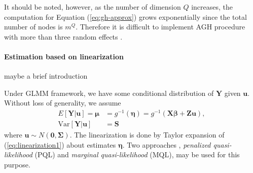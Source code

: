 		It should be noted, however, as the number of dimension $Q$ increases, the computation for Equation (\ref{eq:gh-approx}) grows exponentially since the total number of nodes is $m^Q$.  Therefore it is difficult to implement AGH procedure with more than three random effects \citep{bolker2009generalized}.

		
		\paragraph{Estimation based on linearization}\label{para:linearization}
		
		{\large maybe a brief introduction}
		
		Under GLMM framework, we have some conditional distribution of $\bm Y$ given $\bm u$. Without loss of generality, we assume
		\begin{equation}\label{eq:linearization1}
		\begin{aligned}
		E[\bm Y|\bm u] = \bm \mu &= g^{-1}(\bm \eta) = g^{-1}(\bm{X\beta} + \bm {Zu}), \\
		\text{Var}[\bm Y|\bm u]  & = \bm S
		\end{aligned}
		\end{equation}
		where $\bm u \sim N(\bm 0, \bm \Sigma)$.  The linearization is done by Taylor expansion of (\ref{eq:linearization1}) about estimates $\bm \eta$. Two approaches \citep{breslow1993approximate}, \textit{penalized quasi-likelihood } (PQL) and \textit{marginal quasi-likelihood} (MQL), may be used for this purpose. 
		
